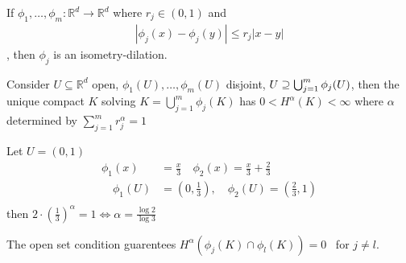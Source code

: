 \begin{theorem}
	If $\phi_1, \ldots, \phi_m: \mathbb{R}^d \to \mathbb{R}^d$ where $r_j \in (0,1)$ and 
	 \begin{align*}
	|\phi_j (x) - \phi_j (y) | \leq r_{j} |x - y|
	\end{align*},
	then $\phi_j$ is an isometry-dilation.

	Consider $U \subseteq \mathbb{R}^d$ open, $\phi_1 (U), \ldots , \phi_m(U)$ disjoint,
	$U \supseteq \bigcup_{j = 1}^{m} \phi_j (U)$, then the unique compact $K$ solving $K = \bigcup_{j = 1}^{m}\phi_j (K)$ has 
	$0 < H^{\alpha}(K) < \infty$ where $\alpha$ determined by 
	$\sum_{j=1}^{m} r_{j}^{\alpha} = 1$
\end{theorem}

\begin{example}
	Let $U = (0,1)$
	\begin{align*}
		\phi_1 (x) &= \frac{x}{3} \quad \phi_{2} (x) = \frac{x}{3} + \frac{2}{3} \\
		\quad \phi_1 (U) & = (0,\frac{1}{3} ), \quad \phi_2 (U) = (\frac{2}{3}, 1) \\
	\end{align*} 
then $2 \cdot (\frac{1}{3})^{\alpha} = 1 \iff \alpha = \frac{\log 2}{\log 3}$ 

The open set condition guarentees $H^{\alpha}( \phi_j (K) \cap \phi_l (K)) = 0$ \,
for $j \neq l$.
\end{example}

